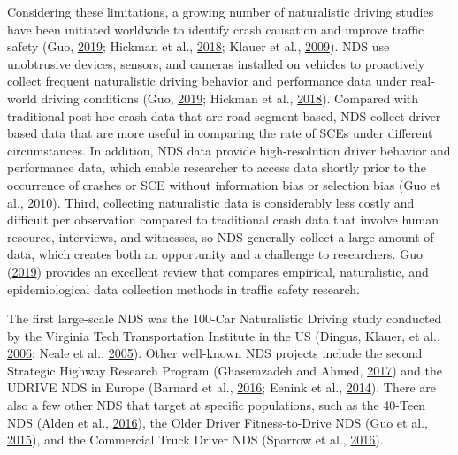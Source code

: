 \documentclass[12pt]{book}
\numberwithin{equation}{chapter}
\begin{document}
Considering these limitations, a growing number of naturalistic driving studies have been initiated worldwide to identify crash causation and improve traffic safety (Guo, \protect\hyperlink{ref-guo2019statistical}{2019}; Hickman et al., \protect\hyperlink{ref-hickman2018synthetic}{2018}; Klauer et al., \protect\hyperlink{ref-klauer2009comparing}{2009}). NDS use unobtrusive devices, sensors, and cameras installed on vehicles to proactively collect frequent naturalistic driving behavior and performance data under real-world driving conditions (Guo, \protect\hyperlink{ref-guo2019statistical}{2019}; Hickman et al., \protect\hyperlink{ref-hickman2018synthetic}{2018}). Compared with traditional post-hoc crash data that are road segment-based, NDS collect driver-based data that are more useful in comparing the rate of SCEs under different circumstances. In addition, NDS data provide high-resolution driver behavior and performance data, which enable researcher to access data shortly prior to the occurrence of crashes or SCE without information bias or selection bias (Guo et al., \protect\hyperlink{ref-guo2010near}{2010}). Third, collecting naturalistic data is considerably less costly and difficult per observation compared to traditional crash data that involve human resource, interviews, and witnesses, so NDS generally collect a large amount of data, which creates both an opportunity and a challenge to researchers. Guo (\protect\hyperlink{ref-guo2019statistical}{2019}) provides an excellent review that compares empirical, naturalistic, and epidemiological data collection methods in traffic safety research.

The first large-scale NDS was the 100-Car Naturalistic Driving study conducted by the Virginia Tech Transportation Institute in the US (Dingus, Klauer, et al., \protect\hyperlink{ref-dingus2006100}{2006}; Neale et al., \protect\hyperlink{ref-neale2005overview}{2005}). Other well-known NDS projects include the second Strategic Highway Research Program (Ghasemzadeh and Ahmed, \protect\hyperlink{ref-ghasemzadeh2017probit}{2017}) and the UDRIVE NDS in Europe (Barnard et al., \protect\hyperlink{ref-barnard2016study}{2016}; Eenink et al., \protect\hyperlink{ref-eenink2014udrive}{2014}). There are also a few other NDS that target at specific populations, such as the 40-Teen NDS (Alden et al., \protect\hyperlink{ref-alden2016animal}{2016}), the Older Driver Fitness-to-Drive NDS (Guo et al., \protect\hyperlink{ref-guo2015older}{2015}), and the Commercial Truck Driver NDS (Sparrow et al., \protect\hyperlink{ref-sparrow2016naturalistic}{2016}).
\end{document}
